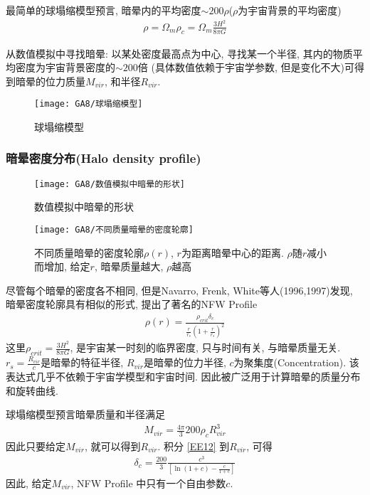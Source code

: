 最简单的球塌缩模型预言, 暗晕内的平均密度$\sim 200\rho$($\rho$为宇宙背景的平均密度)
\begin{align*}
    \rho=\Omega_m\rho_c=\Omega_m\frac{3H^2}{8\pi G}
\end{align*}

从数值模拟中寻找暗晕: 以某处密度最高点为中心, 寻找某一个半径, 其内的物质平均密度为宇宙背景密度的$\sim 200$倍 (具体数值依赖于宇宙学参数, 但是变化不大)可得到暗晕的位力质量$M_{vir}$, 和半径$R_{vir}$. 

\begin{figure}[!htb]
    \centering
    \texttt{[image: GA8/球塌缩模型]}
    \caption{球塌缩模型}
\end{figure}


\subsubsection{暗晕密度分布(Halo density profile)}

\begin{figure}[!htb]
    \centering
    \texttt{[image: GA8/数值模拟中暗晕的形状]}
    \caption{数值模拟中暗晕的形状}
\end{figure}

\begin{figure}[!htb]
    \centering
    \texttt{[image: GA8/不同质量暗晕的密度轮廓]}
    \caption{不同质量暗晕的密度轮廓$\rho(r)$, $r$为距离暗晕中心的距离. $\rho$随$r$减小而增加, 给定$r$, 暗晕质量越大, $\rho$越高}
\end{figure}

尽管每个暗晕的密度各不相同, 但是Navarro, Frenk, White等人(1996,1997)发现, 暗晕密度轮廓具有相似的形式, 提出了著名的NFW Profile
\begin{align}
    \rho(r)=\frac{\rho_{crit}\delta_c}{\frac{r}{r_s}\left( 1+\frac{r}{r_s} \right)^2}\label{EE12}
\end{align}
这里$\rho_{crit}=\frac{3H^2}{8\pi G}$, 是宇宙某一时刻的临界密度, 只与时间有关, 与暗晕质量无关. $r_s=\frac{R_{vir}}{c}$是暗晕的特征半径, $R_{vir}$是暗晕的位力半径, $c$为聚集度(Concentration). 该表达式几乎不依赖于宇宙学模型和宇宙时间. 因此被广泛用于计算暗晕的质量分布和旋转曲线. 

球塌缩模型预言暗晕质量和半径满足
\begin{align*}
    M_{vir}=\frac{4\pi}{3}200\rho_c R_{vir}^3
\end{align*}
因此只要给定$M_{vir}$, 就可以得到$R_{vir}$. 积分 \ref{EE12} 到$R_{vir}$, 可得
\begin{align*}
    \delta_c=\frac{200}{3}\frac{c^3}{\left[ \ln(1+c)-\frac{c}{1+c} \right]}
\end{align*}
因此, 给定$M_{vir}$, NFW Profile 中只有一个自由参数$c$. 

